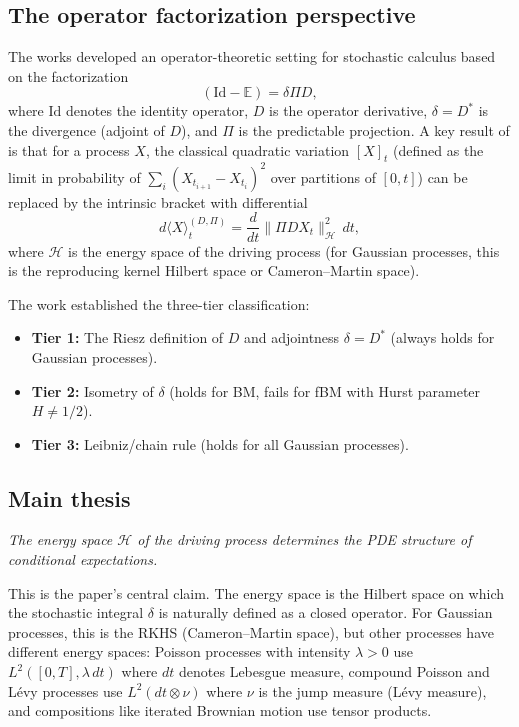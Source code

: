\documentclass[12pt]{article}
\theoremstyle{plain}
\theoremstyle{definition}
\theoremstyle{remark}
\newcommand{\E}{\mathbb{E}}
\newcommand{\HH}{\mathcal{H}}
\begin{document}
\subsection{The operator factorization perspective}

The works \cite{Fontes2026a, Fontes2026b, Fontes2026c, Fontes2026d} developed an operator-theoretic setting for stochastic calculus based on the factorization
\begin{equation}\label{eq:factorization}
(\mathrm{Id} - \E) = \delta \Pi D,
\end{equation}
where $\mathrm{Id}$ denotes the identity operator, $D$ is the operator derivative, $\delta = D^*$ is the divergence (adjoint of $D$), and $\Pi$ is the predictable projection. A key result of \cite{Fontes2026c} is that for a process $X$, the classical quadratic variation $[X]_t$ (defined as the limit in probability of $\sum_{i} (X_{t_{i+1}} - X_{t_i})^2$ over partitions of $[0,t]$) can be replaced by the intrinsic bracket with differential
\begin{equation}\label{eq:intrinsic-bracket-intro}
d\langle X \rangle_t^{(D,\Pi)} = \frac{d}{dt}\|\Pi D X_t\|_{\HH}^2 \, dt,
\end{equation}
where $\HH$ is the energy space of the driving process (for Gaussian processes, this is the reproducing kernel Hilbert space or Cameron--Martin space).

The work \cite{Fontes2026d} established the three-tier classification:
\begin{itemize}
\item \textbf{Tier 1:} The Riesz definition of $D$ and adjointness $\delta = D^*$ (always holds for Gaussian processes).
\item \textbf{Tier 2:} Isometry of $\delta$ (holds for BM, fails for fBM with Hurst parameter $H \neq 1/2$).
\item \textbf{Tier 3:} Leibniz/chain rule (holds for all Gaussian processes).
\end{itemize}

\subsection{Main thesis}

\begin{center}
\emph{The energy space $\HH$ of the driving process determines the PDE structure of conditional expectations.}
\end{center}

This is the paper's central claim. The energy space is the Hilbert space on which the stochastic integral $\delta$ is naturally defined as a closed operator. For Gaussian processes, this is the RKHS (Cameron--Martin space), but other processes have different energy spaces: Poisson processes with intensity $\lambda > 0$ use $L^2([0,T], \lambda\,dt)$ where $dt$ denotes Lebesgue measure, compound Poisson and L\'{e}vy processes use $L^2(dt \otimes \nu)$ where $\nu$ is the jump measure (L\'{e}vy measure), and compositions like iterated Brownian motion use tensor products.
\end{document}
